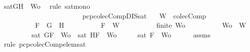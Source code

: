 \begin{isabellebody}
\ {\isacartoucheopen}sat{\isacharparenleft}{\isacharbraceleft}G{\isacharcomma}H{\isacharbraceright}\ {\isasymunion}\ Wo{\isacharprime}{\isacharparenright}{\isacartoucheclose}\ \isamarkupfalse%
\ {\isacharparenleft}rule\ sat{\isacharunderscore}mono{\isacharparenright}\isanewline
\ \ \ \ \ \ \ \ \ \ \ \ \ \ \isamarkupfalse%
\isanewline
\ \ \ \ \ \ \ \ \ \ \ \ \isamarkupfalse%
\isanewline
\ \ \ \ \ \ \ \ \ \ \isamarkupfalse%
\isanewline
\ \ \ \ \ \ \ \ \isamarkupfalse%
\isanewline
\ \ \ \ \ \ \isamarkupfalse%
\isanewline
\ \ \ \ \isamarkupfalse%
\isanewline
\ \ \isamarkupfalse%
\isanewline
{}\isamarkupfalse%
%
\endisatagproof
{\isafoldproof}%
%
\isadelimproof
\isanewline
%
\endisadelimproof
\isanewline
{}\isamarkupfalse%
\ pcp{\isacharunderscore}colecComp{\isacharunderscore}DIS{\isacharunderscore}sat{}{\isacharcolon}\isanewline
\ \ \ {\isachardoublequoteopen}W\ {\isasymin}\ colecComp{\isachardoublequoteclose}\isanewline
\ \ \ \ \ \ \ \ \ \ {\isachardoublequoteopen}F\ {\isacharequal}\ G\ \isactrlbold {\isasymor}\ H{\isachardoublequoteclose}\isanewline
\ \ \ \ \ \ \ \ \ \ {\isachardoublequoteopen}F\ {\isasymin}\ W{\isachardoublequoteclose}\isanewline
\ \ \ \ \ \ \ \ \ \ {\isachardoublequoteopen}finite\ Wo{\isachardoublequoteclose}\isanewline
\ \ \ \ \ \ \ \ \ \ {\isachardoublequoteopen}Wo\ {\isasymsubseteq}\ W{\isachardoublequoteclose}\isanewline
\ \ \ \ \ \ \ \ \ {\isachardoublequoteopen}sat\ {\isacharparenleft}{\isacharbraceleft}G{\isacharcomma}F{\isacharbraceright}\ {\isasymunion}\ Wo{\isacharparenright}\ {\isasymor}\ sat\ {\isacharparenleft}{\isacharbraceleft}H{\isacharcomma}F{\isacharbraceright}\ {\isasymunion}\ Wo{\isacharparenright}{\isachardoublequoteclose}\isanewline
%
\isadelimproof
%
\endisadelimproof
%
\isatagproof
{}\isamarkupfalse%
\ {\isacharminus}\isanewline
\ \ \isamarkupfalse%
\ {\isachardoublequoteopen}sat\ {\isacharparenleft}{\isacharbraceleft}F{\isacharbraceright}\ {\isasymunion}\ Wo{\isacharparenright}{\isachardoublequoteclose}\isanewline
\ \ \ \ \isamarkupfalse%
\ assms{\isacharparenleft}{}{\isacharcomma}{}{\isacharcomma}{}{\isacharcomma}{}{\isacharparenright}\ \isamarkupfalse%
\ {\isacharparenleft}rule\ pcp{\isacharunderscore}colecComp{\isacharunderscore}elem{\isacharunderscore}sat{\isacharparenright}\isanewline
\ \ \isamarkupfalse%

\end{isabellebody}
